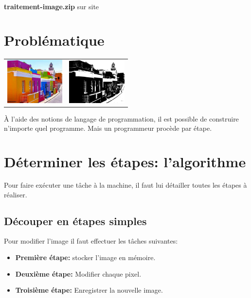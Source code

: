 \documentclass[a4paper,11pt]{article}
\begin{document}
\begin{Form}
\begin{commentprof}
\textbf{traitement-image.zip} sur site
\end{commentprof}
\section{Problématique}
\begin{center}
\begin{tabular}{cc}
\includegraphics[width=3cm]{ressources/maisons-colorees.png}
 & 
\includegraphics[width=3cm]{ressources/maisons-colorees-NB.png}
 \\ 
\end{tabular} 
\end{center}
À l'aide des notions de langage de programmation, il est possible de construire n'importe quel programme. Mais un programmeur procède par étape.
\begin{center}
\end{center}
\section{Déterminer les étapes: l'algorithme}
Pour faire exécuter une tâche à la machine, il faut lui détailler toutes les étapes à réaliser. 
\subsection{Découper en étapes simples}
Pour modifier l'image  il faut effectuer les tâches suivantes:
\begin{itemize}
\item \textbf{Première étape:} stocker l'image en mémoire.
\item \textbf{Deuxième étape:} Modifier chaque pixel.
\item \textbf{Troisième étape:} Enregistrer la nouvelle image.
\end{itemize}

\end{Form}
\end{document}
